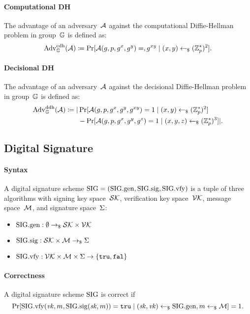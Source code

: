 \documentclass[a4paper,orivec]{llncs}
\begin{document}
\paragraph{Computational DH}
The advantage of an adversary~$\mathcal{A}$ against the computational Diffie-Hellman problem in group~$\mathbb{G}$ is defined as:
\[
\mathrm{Adv}_{\mathbb{G}}^{\mathrm{cdh}}(\mathcal{A})\coloneqq\Pr[\mathcal{A}(g,p,g^x,g^y)=,g^{xy}\mid (x,y)\gets_\$(\mathbb{Z}_p^*)^2]\text{.}
\]

\paragraph{Decisional DH}
The advantage of an adversary~$\mathcal{A}$ against the decisional Diffie-Hellman problem in group~$\mathbb{G}$ is defined as:
\begin{align*}
    \mathrm{Adv}_{\mathbb{G}}^{\mathrm{ddh}}(\mathcal{A})\coloneqq|&\Pr[\mathcal{A}(g,p,g^x,g^y,g^{xy})=1\mid (x,y)\gets_\$(\mathbb{Z}_p^*)^2]\\
    &-\Pr[\mathcal{A}(g,p,g^x,g^y,g^z)=1\mid (x,y,z)\gets_\$(\mathbb{Z}_p^*)^3]|\text{.}
\end{align*}

\subsection{Digital Signature}

\paragraph{Syntax}
A digital signature scheme $\mathrm{SIG}=(\mathrm{SIG}.\mathrm{gen},\mathrm{SIG}.\mathrm{sig},\mathrm{SIG}.\mathrm{vfy})$ is a tuple of three algorithms with signing key space~$\mathcal{SK}$, verification key space~$\mathcal{VK}$, message space~$\mathcal{M}$, and signature space~$\Sigma$:

\begin{itemize}
    \item $\mathrm{SIG}.\mathrm{gen}: \emptyset \to_\$ \mathcal{SK}\times\mathcal{VK}$
    \item $\mathrm{SIG}.\mathrm{sig}: \mathcal{SK}\times\mathcal{M} \to_\$ \Sigma$
    \item $\mathrm{SIG}.\mathrm{vfy}: \mathcal{VK}\times\mathcal{M}\times\Sigma \to \{\mathtt{tru},\mathtt{fal}\}$
\end{itemize}

\paragraph{Correctness}
A digital signature scheme $\mathrm{SIG}$ is correct if
\[
\Pr[\mathrm{SIG}.\mathrm{vfy}(\mathit{vk},m,\mathrm{SIG}.\mathrm{sig}(\mathit{sk},m))=\mathtt{tru}\mid (\mathit{sk},\mathit{vk})\gets_\$\mathrm{SIG}.\mathrm{gen},m\gets_\$\mathcal{M}]=1\text{.}
\]
\end{document}
